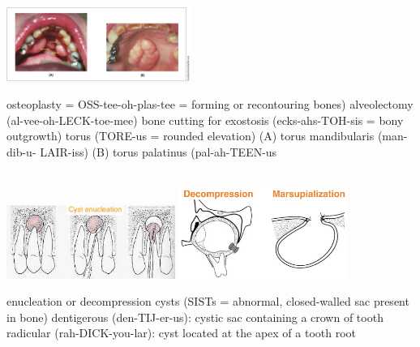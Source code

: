 \documentclass[
paper=landscape,
paper=160mm:90mm, %
fontsize=11pt, %
pagesize, %
parskip=half-, %
]{scrartcl} %
\newenvironment{WrapText1}[3][r]
{\wrapfigure[#2]{#1}{#3}}
{\endwrapfigure}
\newcommand{\wrapr}[6]{
\begin{minipage}{\linewidth}\mbox{}\\
\vspace{#1}
\begin{WrapText1}{#2}{#3}
\vspace{#4}#5\end{WrapText1}#6
\end{minipage}}
\theoremstyle{mythmstyle} %
\begin{document}


\wrapr{-10mm}{7}{6cm}{+16mm}
{\includegraphics[width=6cm]{torus.png}}
{%
\begin{outline}
\1 osteoplasty = OSS-tee-oh-plas-tee = forming or recontouring bones)
\1 alveolectomy (al-vee-oh-LECK-toe-mee)
\1 bone cutting for
    \2 exostosis (ecks-ahs-TOH-sis = bony outgrowth)
    \2 torus (TORE-us = rounded elevation)
        \3 (A) torus mandibularis (man-dib-u- LAIR-iss)
        \3 (B) torus palatinus (pal-ah-TEEN-us
        
\end{outline}
} %


\clearpage

\wrapr{-8mm}{7}{6cm}{+8mm}
{%
\includegraphics[width=5.5cm]{enucleation.jpeg}
\includegraphics[width=5.5cm]{decompression.jpeg}
} %
{%
\begin{outline}
\1 enucleation or decompression
    \2 cysts (SISTs = abnormal, closed-walled sac present in bone)
    \3 dentigerous (den-TIJ-er-us): cystic sac containing a crown of tooth
    \3 radicular (rah-DICK-you-lar): cyst located at the apex of a tooth root
\end{outline}
} %
\end{document}
